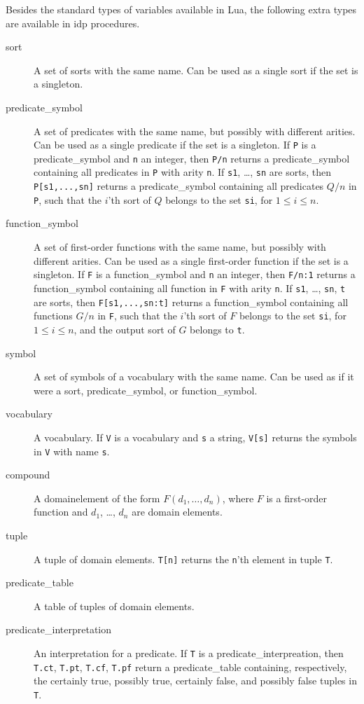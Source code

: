 \documentclass[a4]{article}
\newcommand{\idp}{{\sc idp}\xspace}
\begin{document}
Besides the standard types of variables available in Lua, the following extra types are available in \idp procedures.
\begin{description}
	\item[sort] A set of sorts with the same name. Can be used as a single sort if the set is a singleton.
	\item[predicate\_symbol] A set of predicates with the same name, but possibly with different arities. Can be used as a single predicate if the set is a singleton. If {\tt P} is a predicate\_symbol and {\tt n} an integer, then {\tt P/n} returns a predicate\_symbol containing all predicates in {\tt P} with arity {\tt n}. If {\tt s1}, \ldots, {\tt sn} are sorts, then {\tt P[s1,...,sn]} returns a predicate\_symbol containing all predicates $Q/n$ in {\tt P}, such that the $i$'th sort of $Q$ belongs to the set {\tt si}, for $1 \leq i \leq n$.
	\item[function\_symbol] A set of first-order functions with the same name, but possibly with different arities. Can be used as a single first-order function if the set is a singleton. If {\tt F} is a function\_symbol and {\tt n} an integer, then {\tt F/n:1} returns a function\_symbol containing all function in {\tt F} with arity {\tt n}. If {\tt s1}, \ldots, {\tt sn}, {\tt t} are sorts, then {\tt F[s1,...,sn:t]} returns a function\_symbol containing all functions $G/n$ in {\tt F}, such that the $i$'th sort of $F$ belongs to the set {\tt si}, for $1 \leq i \leq n$, and the output sort of $G$ belongs to {\tt t}.
	\item[symbol] A set of symbols of a vocabulary with the same name. Can be used as if it were a sort, predicate\_symbol, or function\_symbol.
	\item[vocabulary] A vocabulary. If {\tt V} is a vocabulary and {\tt s} a string, {\tt V[s]} returns the symbols in {\tt V} with name {\tt s}. 
	\item[compound] A domainelement of the form $F(d_1,\ldots,d_n)$, where $F$ is a first-order function and $d_1$, \ldots, $d_n$ are domain elements.
	\item[tuple] A tuple of domain elements. {\tt T[n]} returns the {\tt n}'th element in tuple {\tt T}.
	\item[predicate\_table] A table of tuples of domain elements.
	\item[predicate\_interpretation] An interpretation for a predicate. If {\tt T} is a predicate\_interpreation, then {\tt T.ct}, {\tt T.pt}, {\tt T.cf}, {\tt T.pf} return a predicate\_table containing, respectively, the certainly true, possibly true, certainly false, and possibly false tuples in {\tt T}. %

\end{description}
\end{document}
